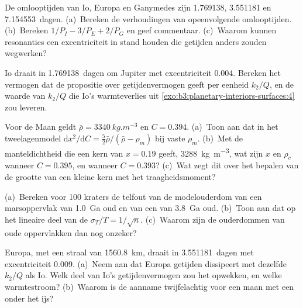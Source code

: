 \begin{exercise}[$\star\star$]\label{exo:b3:planetary-interiors-surfaces:8}
De omlooptijden van Io, Europa en Ganymedes zijn 1.769138, 3.551181 en
\num{7.154553}~dagen. (a)~Bereken de verhoudingen van opeenvolgende omlooptijden.
(b)~Bereken $1/P_I - 3/P_E + 2/P_G$ en geef commentaar. (c)~Waarom kunnen resonanties
een excentriciteit in stand houden die getijden anders zouden wegwerken?
\end{exercise}

\begin{exercise}[$\star\star$]\label{exo:b3:planetary-interiors-surfaces:9}
Io draait in \num{1.769138}~dagen om Jupiter met excentriciteit 0.004.
Bereken het vermogen dat de propositie over getijdenvermogen geeft per eenheid $k_2/Q$,
en de waarde van $k_2/Q$ die Io's warmteverlies
uit \cref{exo:b3:planetary-interiors-surfaces:4} zou leveren.
\end{exercise}

\begin{exercise}[$\star\star\star$]\label{exo:b3:planetary-interiors-surfaces:10}
Voor de Maan geldt $\bar\rho = \qty{3340}{kg.m^{-3}}$ en $C = 0.394$.
(a)~Toon aan dat in het tweelagenmodel $\mathrm dx^2/\mathrm dC =
\tfrac52\bar\rho/(\bar\rho - \rho_m)$ bij vaste $\rho_m$. (b)~Met de
manteldichtheid die een kern van $x = 0.19$ geeft, \qty{3288}{kg.m^{-3}},
wat zijn $x$ en $\rho_c$ wanneer $C = 0.395$, en wanneer $C = 0.393$?
(c)~Wat zegt dit over het bepalen van de grootte van een kleine kern met
het traagheidsmoment?
\end{exercise}

\begin{exercise}[$\star\star\star$]\label{exo:b3:planetary-interiors-surfaces:11}
(a)~Bereken voor 100 kraters de telfout van de modelouderdom van een
marsoppervlak van \qty{1.0}{Ga} oud en van een van \qty{3.8}{Ga} oud.
(b)~Toon aan dat op het lineaire deel van de  $\sigma_T/T =
1/\sqrt n$. (c)~Waarom zijn de ouderdommen van oude oppervlakken dan nog onzeker?
\end{exercise}

\begin{exercise}[$\star\star\star$]\label{exo:b3:planetary-interiors-surfaces:12}
Europa, met een straal van \qty{1560.8}{km}, draait in \num{3.551181}~dagen met
excentriciteit 0.009. (a)~Neem aan dat Europa getijden dissipeert met dezelfde $k_2/Q$
als Io. Welk deel van Io's getijdenvermogen zou het opwekken, en welke warmtestroom?
(b)~Waarom is de aanname twijfelachtig voor een maan met een  onder het ijs?
\end{exercise}


